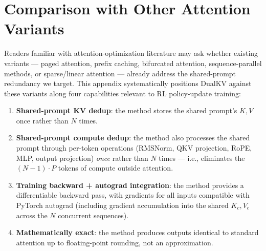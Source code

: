 \documentclass{article}
\begin{document}

\section{Comparison with Other Attention Variants}
\label{app:attention-comparison}

Readers familiar with attention-optimization literature may ask whether existing variants --- paged attention, prefix caching, bifurcated attention, sequence-parallel methods, or sparse/linear attention --- already address the shared-prompt redundancy we target. This appendix systematically positions DualKV against these variants along four capabilities relevant to RL policy-update training:

\begin{enumerate}
  \item \textbf{Shared-prompt KV dedup}: the method stores the shared prompt's $K, V$ once rather than $N$ times.
  \item \textbf{Shared-prompt compute dedup}: the method also processes the shared prompt through per-token operations (RMSNorm, QKV projection, RoPE, MLP, output projection) \emph{once} rather than $N$ times --- i.e., eliminates the $(N{-}1) \cdot P$ tokens of compute outside attention.
  \item \textbf{Training backward + autograd integration}: the method provides a differentiable backward pass, with gradients for all inputs compatible with PyTorch autograd (including gradient accumulation into the shared $K_c, V_c$ across the $N$ concurrent sequences).
  \item \textbf{Mathematically exact}: the method produces outputs identical to standard attention up to floating-point rounding, not an approximation.
\end{enumerate}
\end{document}
